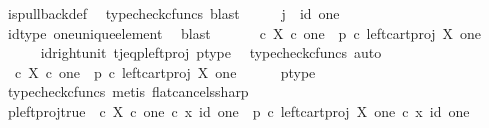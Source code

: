 \begin{isabellebody}
\ is{\isacharunderscore}{\kern0pt}pullback{\isacharunderscore}{\kern0pt}def\ \isamarkupfalse%
\ {\isacharparenleft}{\kern0pt}typecheck{\isacharunderscore}{\kern0pt}cfuncs{\isacharcomma}{\kern0pt}\ blast{\isacharparenright}{\kern0pt}\isanewline
\ \ \isamarkupfalse%
\ \isamarkupfalse%
\ {\isachardoublequoteopen}j\ {\isacharequal}{\kern0pt}\ id\ one{\isachardoublequoteclose}\isanewline
\ \ \ \ \isamarkupfalse%
\ id{\isacharunderscore}{\kern0pt}type\ one{\isacharunderscore}{\kern0pt}unique{\isacharunderscore}{\kern0pt}element\ \isamarkupfalse%
\ blast\isanewline
\ \ \isamarkupfalse%
\ \isamarkupfalse%
\ {\isachardoublequoteopen}{\isacharparenleft}{\kern0pt}{\isasymt}\ {\isasymcirc}\isactrlsub c\ {\isasymbeta}\isactrlbsub X\ {\isasymtimes}\isactrlsub c\ one\isactrlesub {\isacharparenright}{\kern0pt}\isactrlsup {\isasymsharp}\ {\isacharequal}{\kern0pt}\ {\isacharparenleft}{\kern0pt}p\ {\isasymcirc}\isactrlsub c\ left{\isacharunderscore}{\kern0pt}cart{\isacharunderscore}{\kern0pt}proj\ X\ one{\isacharparenright}{\kern0pt}\isactrlsup {\isasymsharp}{\isachardoublequoteclose}\isanewline
\ \ \ \ \isamarkupfalse%
\ id{\isacharunderscore}{\kern0pt}right{\isacharunderscore}{\kern0pt}unit{}\ t{\isacharunderscore}{\kern0pt}j{\isacharunderscore}{\kern0pt}eq{\isacharunderscore}{\kern0pt}p{\isacharunderscore}{\kern0pt}left{\isacharunderscore}{\kern0pt}proj\ p{\isacharunderscore}{\kern0pt}type\ \isamarkupfalse%
\ {\isacharparenleft}{\kern0pt}typecheck{\isacharunderscore}{\kern0pt}cfuncs{\isacharcomma}{\kern0pt}\ auto{\isacharparenright}{\kern0pt}\isanewline
\ \ \isamarkupfalse%
\ \isamarkupfalse%
\ {\isachardoublequoteopen}{\isasymt}\ {\isasymcirc}\isactrlsub c\ {\isasymbeta}\isactrlbsub X\ {\isasymtimes}\isactrlsub c\ one\isactrlesub \ {\isacharequal}{\kern0pt}\ p\ {\isasymcirc}\isactrlsub c\ left{\isacharunderscore}{\kern0pt}cart{\isacharunderscore}{\kern0pt}proj\ X\ one{\isachardoublequoteclose}\isanewline
\ \ \ \ \isamarkupfalse%
\ p{\isacharunderscore}{\kern0pt}type\ \isamarkupfalse%
\ {\isacharparenleft}{\kern0pt}typecheck{\isacharunderscore}{\kern0pt}cfuncs{\isacharcomma}{\kern0pt}\ metis\ flat{\isacharunderscore}{\kern0pt}cancels{\isacharunderscore}{\kern0pt}sharp{\isacharparenright}{\kern0pt}\isanewline
\ \ \isamarkupfalse%
\ \isamarkupfalse%
\ p{\isacharunderscore}{\kern0pt}left{\isacharunderscore}{\kern0pt}proj{\isacharunderscore}{\kern0pt}true{\isacharcolon}{\kern0pt}\ {\isachardoublequoteopen}{\isasymt}\ {\isasymcirc}\isactrlsub c\ {\isasymbeta}\isactrlbsub X\ {\isasymtimes}\isactrlsub c\ one\isactrlesub \ {\isasymcirc}\isactrlsub c\ {\isasymlangle}x{\isacharcomma}{\kern0pt}\ id\ one{\isasymrangle}\ {\isacharequal}{\kern0pt}\ p\ {\isasymcirc}\isactrlsub c\ left{\isacharunderscore}{\kern0pt}cart{\isacharunderscore}{\kern0pt}proj\ X\ one\ {\isasymcirc}\isactrlsub c\ {\isasymlangle}x{\isacharcomma}{\kern0pt}\ id\ one{\isasymrangle}{\isachardoublequoteclose}\isanewline

\end{isabellebody}
